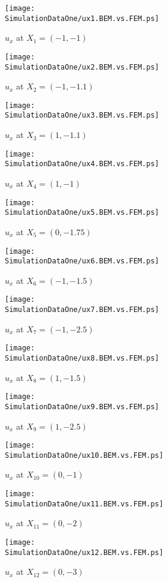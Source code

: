 \begin{figure}[h]
\begin{minipage}[c]{7.5cm}
\texttt{[image: \\SimulationDataOne/ux1.BEM.vs.FEM.ps]}
\caption{$u_x$ at $X_1=(-1,-1)$}\label{fig:Ex2:Displacement:CharacteristicPoint1}
\end{minipage}
\begin{minipage}[c]{7.5cm}
\texttt{[image: \\SimulationDataOne/ux2.BEM.vs.FEM.ps]}
\caption{$u_x$ at $X_2=(-1,-1.1)$}
\end{minipage}

\begin{minipage}[c]{7.5cm}
\texttt{[image: \\SimulationDataOne/ux3.BEM.vs.FEM.ps]}
\caption{$u_x$ at $X_3=(1,-1.1)$}
\end{minipage}
\begin{minipage}[c]{7.5cm}
\texttt{[image: \\SimulationDataOne/ux4.BEM.vs.FEM.ps]}
\caption{$u_x$ at $X_4=(1,-1)$}
\end{minipage}

\begin{minipage}[c]{7.5cm}
\texttt{[image: \\SimulationDataOne/ux5.BEM.vs.FEM.ps]}
\caption{$u_x$ at $X_5=(0,-1.75)$}
\end{minipage}
\begin{minipage}[c]{7.5cm}
\texttt{[image: \\SimulationDataOne/ux6.BEM.vs.FEM.ps]}
\caption{$u_x$ at $X_6=(-1,-1.5)$}
\end{minipage}
\end{figure}


\begin{figure}[h]
\begin{minipage}[c]{7.5cm}
\texttt{[image: \\SimulationDataOne/ux7.BEM.vs.FEM.ps]}
\caption{$u_x$ at $X_7=(-1,-2.5)$}
\end{minipage}
\begin{minipage}[c]{7.5cm}
\texttt{[image: \\SimulationDataOne/ux8.BEM.vs.FEM.ps]}
\caption{$u_x$ at $X_8=(1,-1.5)$}
\end{minipage}


\begin{minipage}[c]{7.5cm}
\texttt{[image: \\SimulationDataOne/ux9.BEM.vs.FEM.ps]}
\caption{$u_x$ at $X_9=(1,-2.5)$}
\end{minipage}
\begin{minipage}[c]{7.5cm}
\texttt{[image: \\SimulationDataOne/ux10.BEM.vs.FEM.ps]}
\caption{$u_x$ at $X_{10}=(0,-1)$}
\end{minipage}

\begin{minipage}[c]{7.5cm}
\texttt{[image: \\SimulationDataOne/ux11.BEM.vs.FEM.ps]}
\caption{$u_x$ at $X_{11}=(0,-2)$}
\end{minipage}
\begin{minipage}[c]{7.5cm}
\texttt{[image: \\SimulationDataOne/ux12.BEM.vs.FEM.ps]}
\caption{$u_x$ at $X_{12}=(0,-3)$}\label{fig:Ex2:Displacement:CharacteristicPoint12}
\end{minipage}
\end{figure}
\clearpage

